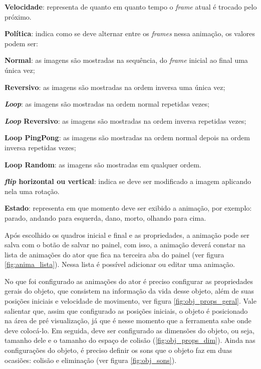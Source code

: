 \documentclass[12pt,oneside,openright,a4paper,english,brazil,sumario=tradicional]{abntex2}
\begin{document}
\begin{anexosenv}
   \begin{alineas}
   \item \textbf{Velocidade}: representa de quanto em quanto tempo o \emph{frame} atual é trocado pelo próximo.
   \item \textbf{Política}: indica como se deve alternar entre os \emph{frames} nessa animação, os valores podem ser:
      \begin{alineas}
      \item \textbf{Normal}: as imagens são mostradas na sequência, do \emph{frame} inicial ao final uma única vez;
      \item \textbf{Reversivo}: as imagens são mostradas na ordem inversa uma única vez;
      \item \textbf{\emph{Loop}}: as imagens são mostradas na ordem normal repetidas vezes;
      \item \textbf{\emph{Loop} Reversivo}: as imagens são mostradas na ordem inversa repetidas vezes;
      \item \textbf{Loop PingPong}: as imagens são mostradas na ordem normal depois na ordem inversa repetidas vezes;
      \item \textbf{Loop Random}: as imagens são mostradas em qualquer ordem.
      \end{alineas}
   \item \textbf{\emph{flip} horizontal ou vertical}: indica se deve ser modificado a imagem aplicando nela uma rotação.
   \item \textbf{Estado}: representa em que momento deve ser exibido a animação, por exemplo: parado, andando para esquerda, dano, morto, olhando para cima.
   \end{alineas}

   Após escolhido os quadros inicial e final e as propriedades, a animação pode ser salva com o botão de salvar no painel, com isso, a animação deverá constar na lista de animações do ator que fica na terceira aba do painel (ver figura \ref{fig:anima_lista}). Nessa lista é possível adicionar ou editar uma animação.

   No que foi configurado as animações do ator é preciso configurar as propriedades gerais do objeto, que consistem na informação da vida desse objeto, além de suas posições iniciais e velocidade de movimento, ver figura \ref{fig:obj_props_geral}. Vale salientar que, assim que configurado as posições iniciais, o objeto é posicionado na área de pré visualização, já que é nesse momento que a ferramenta sabe onde deve colocá-lo.
   Em seguida, deve ser configurado as dimensões do objeto, ou seja, tamanho dele e o tamanho do espaço de colisão (\ref{fig:obj_props_dim}). Ainda nas configurações do objeto, é preciso definir os sons que o objeto faz em duas ocasiões: colisão e eliminação (ver figura \ref{fig:obj_sons}).


\end{anexosenv}
\end{document}
